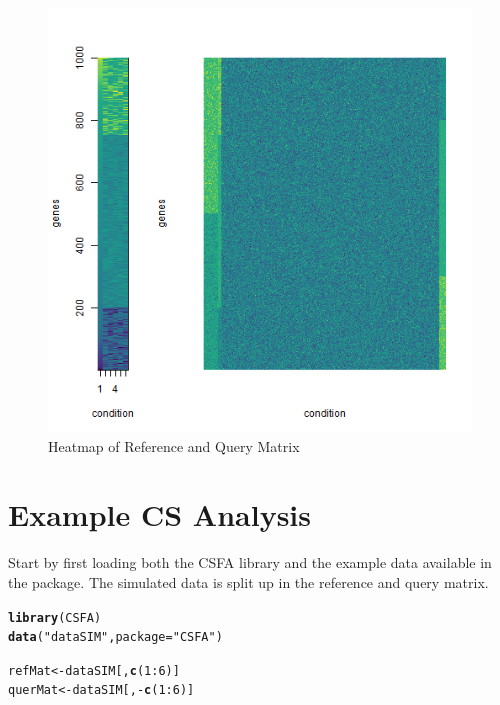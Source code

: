 \documentclass[a4paper]{article}\usepackage[]{graphicx}\usepackage[]{color}
\makeatletter
\def\maxwidth{ %
  \ifdim\Gin@nat@width>\linewidth
    \linewidth
  \else
    \Gin@nat@width
  \fi
}
\newcommand{\hlnum}[1]{\textcolor[rgb]{0.686,0.059,0.569}{#1}}%
\newcommand{\hlstr}[1]{\textcolor[rgb]{0.192,0.494,0.8}{#1}}%
\newcommand{\hlopt}[1]{\textcolor[rgb]{0,0,0}{#1}}%
\newcommand{\hlstd}[1]{\textcolor[rgb]{0.345,0.345,0.345}{#1}}%
\newcommand{\hlkwb}[1]{\textcolor[rgb]{0.69,0.353,0.396}{#1}}%
\newcommand{\hlkwc}[1]{\textcolor[rgb]{0.333,0.667,0.333}{#1}}%
\newcommand{\hlkwd}[1]{\textcolor[rgb]{0.737,0.353,0.396}{\textbf{#1}}}%
\newenvironment{kframe}{%
 \def\at@end@of@kframe{}%
 \ifinner\ifhmode%
  \def\at@end@of@kframe{\end{minipage}}%
  \begin{minipage}{\columnwidth}%
 \fi\fi%
 \def\FrameCommand##1{\hskip\@totalleftmargin \hskip-\fboxsep
 \colorbox{shadecolor}{##1}\hskip-\fboxsep
     \hskip-\linewidth \hskip-\@totalleftmargin \hskip\columnwidth}%
 \MakeFramed {\advance\hsize-\width
   \@totalleftmargin\z@ \linewidth\hsize
   \@setminipage}}%
 {\par\unskip\endMakeFramed%
 \at@end@of@kframe}
\newenvironment{knitrout}{}{} %
\makeatother
\begin{document}
\begin{knitrout}
\color{fgcolor}\begin{figure}[H]
\includegraphics[width=\maxwidth]{figure/data_heatmap-1} \caption[Heatmap of Reference and Query Matrix]{Heatmap of Reference and Query Matrix}\label{fig:data_heatmap}
\end{figure}


\end{knitrout}


\section{Example CS Analysis}
Start by first loading both the CSFA library and the example data available
in the package. The simulated data is split up in the reference and query
matrix.

\begin{knitrout}
\color{fgcolor}\begin{kframe}
\begin{alltt}
        \hlkwd{library}\hlstd{(CSFA)}
        \hlkwd{data}\hlstd{(}\hlstr{"dataSIM"}\hlstd{,}\hlkwc{package}\hlstd{=}\hlstr{"CSFA"}\hlstd{)}

        \hlstd{refMat} \hlkwb{<-} \hlstd{dataSIM[,}\hlkwd{c}\hlstd{(}\hlnum{1}\hlopt{:}\hlnum{6}\hlstd{)]}
        \hlstd{querMat} \hlkwb{<-} \hlstd{dataSIM[,}\hlopt{-}\hlkwd{c}\hlstd{(}\hlnum{1}\hlopt{:}\hlnum{6}\hlstd{)]}
\end{alltt}
\end{kframe}
\end{knitrout}
\end{document}
